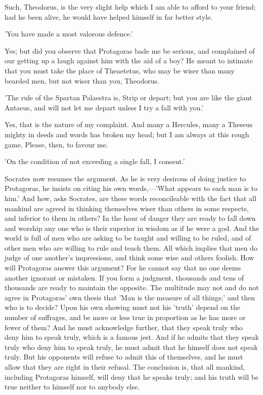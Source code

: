 \documentclass[11pt,letter]{article}
\begin{document}
\par  Such, Theodorus, is the very slight help which I am able to afford to your friend; had he been alive, he would have helped himself in far better style.

\par  'You have made a most valorous defence.'

\par  Yes; but did you observe that Protagoras bade me be serious, and complained of our getting up a laugh against him with the aid of a boy? He meant to intimate that you must take the place of Theaetetus, who may be wiser than many bearded men, but not wiser than you, Theodorus.

\par  'The rule of the Spartan Palaestra is, Strip or depart; but you are like the giant Antaeus, and will not let me depart unless I try a fall with you.'

\par  Yes, that is the nature of my complaint. And many a Hercules, many a Theseus mighty in deeds and words has broken my head; but I am always at this rough game. Please, then, to favour me.

\par  'On the condition of not exceeding a single fall, I consent.'

\par  Socrates now resumes the argument. As he is very desirous of doing justice to Protagoras, he insists on citing his own words,—'What appears to each man is to him.' And how, asks Socrates, are these words reconcileable with the fact that all mankind are agreed in thinking themselves wiser than others in some respects, and inferior to them in others? In the hour of danger they are ready to fall down and worship any one who is their superior in wisdom as if he were a god. And the world is full of men who are asking to be taught and willing to be ruled, and of other men who are willing to rule and teach them. All which implies that men do judge of one another's impressions, and think some wise and others foolish. How will Protagoras answer this argument? For he cannot say that no one deems another ignorant or mistaken. If you form a judgment, thousands and tens of thousands are ready to maintain the opposite. The multitude may not and do not agree in Protagoras' own thesis that 'Man is the measure of all things;' and then who is to decide? Upon his own showing must not his 'truth' depend on the number of suffrages, and be more or less true in proportion as he has more or fewer of them? And he must acknowledge further, that they speak truly who deny him to speak truly, which is a famous jest. And if he admits that they speak truly who deny him to speak truly, he must admit that he himself does not speak truly. But his opponents will refuse to admit this of themselves, and he must allow that they are right in their refusal. The conclusion is, that all mankind, including Protagoras himself, will deny that he speaks truly; and his truth will be true neither to himself nor to anybody else.
\end{document}
